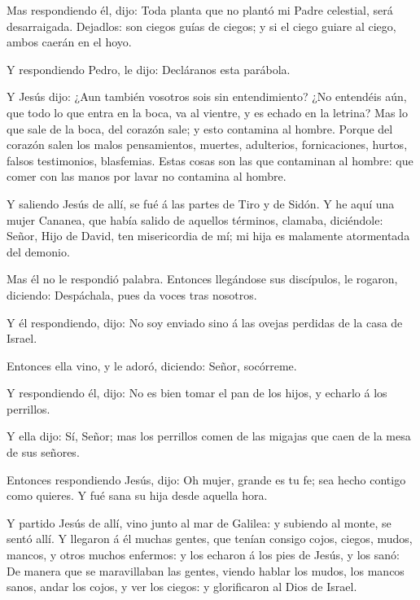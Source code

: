  Mas respondiendo él, dijo: Toda planta que no plantó mi
Padre celestial, será desarraigada.  Dejadlos: son ciegos
guías de ciegos; y si el ciego guiare al ciego, ambos caerán en el hoyo.

 Y respondiendo Pedro, le dijo: Decláranos esta parábola.

 Y Jesús dijo: ¿Aun también vosotros sois sin
entendimiento?  ¿No entendéis aún, que todo lo que entra en
la boca, va al vientre, y es echado en la letrina?  Mas lo
que sale de la boca, del corazón sale; y esto contamina al hombre.
 Porque del corazón salen los malos pensamientos, muertes,
adulterios, fornicaciones, hurtos, falsos testimonios, blasfemias.
 Estas cosas son las que contaminan al hombre: que comer
con las manos por lavar no contamina al hombre.

 Y saliendo Jesús de allí, se fué á las partes de Tiro y de
Sidón.  Y he aquí una mujer Cananea, que había salido de
aquellos términos, clamaba, diciéndole: Señor, Hijo de David, ten
misericordia de mí; mi hija es malamente atormentada del demonio.

 Mas él no le respondió palabra. Entonces llegándose sus
discípulos, le rogaron, diciendo: Despáchala, pues da voces tras
nosotros.

 Y él respondiendo, dijo: No soy enviado sino á las ovejas
perdidas de la casa de Israel.

 Entonces ella vino, y le adoró, diciendo: Señor,
socórreme.

 Y respondiendo él, dijo: No es bien tomar el pan de los
hijos, y echarlo á los perrillos.

 Y ella dijo: Sí, Señor; mas los perrillos comen de las
migajas que caen de la mesa de sus señores.

 Entonces respondiendo Jesús, dijo: Oh mujer, grande es tu
fe; sea hecho contigo como quieres. Y fué sana su hija desde aquella
hora.

 Y partido Jesús de allí, vino junto al mar de Galilea: y
subiendo al monte, se sentó allí.  Y llegaron á él muchas
gentes, que tenían consigo cojos, ciegos, mudos, mancos, y otros muchos
enfermos: y los echaron á los pies de Jesús, y los sanó: 
De manera que se maravillaban las gentes, viendo hablar los mudos, los
mancos sanos, andar los cojos, y ver los ciegos: y glorificaron al Dios
de Israel.

